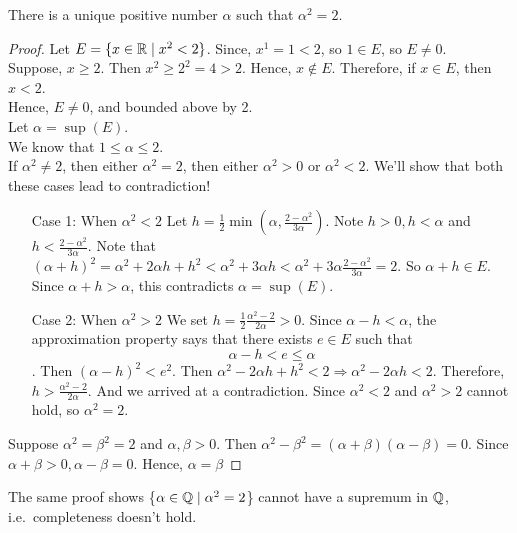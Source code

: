 \documentclass[11pt]{article}
\begin{document}
\begin{theorem}
	There is a unique positive number \(\alpha\) such that \(\alpha^2 = 2\).
\end{theorem}

\begin{proof}
	Let \(E = \{x \in \mathbb R \mid x^2 < 2\}\). Since, \(x^1 = 1 < 2\), so \(1 \in E\), so \(E \neq 0\). \\
	Suppose, \(x \geqslant 2\). Then \(x^2 \geqslant 2^2 = 4 > 2\). Hence, \(x \notin E\).
	Therefore, if \(x \in E\), then \(x < 2\). \\
	Hence, \(E \neq 0\), and bounded above by 2. \\
	Let \(\alpha = \sup(E)\). \\
	We know that \(1 \leqslant \alpha \leqslant 2\). \\
	If \(\alpha^2 \neq 2\), then either \(\alpha^2 = 2\), then either \(\alpha^2 > 0\) or \(\alpha^2 < 2\). We'll show that both these cases lead to contradiction!
	\begin{itemize}
		\item[Case 1:] When \(\alpha^2 < 2\) Let \(h = \frac{1}{2} \min(\alpha, \frac{2 -
			      \alpha^2}{3\alpha})\). Note \(h > 0, h < \alpha\) and \(h < \frac{2
			      -\alpha^2}{3\alpha}\). Note that \((\alpha + h)^2 = \alpha^2 + 2\alpha h + h^2
		      < \alpha^2 + 3\alpha h < \alpha^2 + 3\alpha \frac{2 - \alpha^2}{3\alpha} = 2\).
		      So \(\alpha + h \in E\). Since \(\alpha + h > \alpha\), this contradicts
		      \(\alpha = \sup(E)\).
		\item[Case 2:] When \(\alpha^2 > 2\) We set \(h = \frac{1}{2} \frac{\alpha^2 -
			      2}{2\alpha} > 0\). Since \(\alpha - h < \alpha\), the approximation property
		      says that there exists \(e \in E\) such that \[\alpha - h < e \leqslant \alpha\]. Then \((\alpha - h)^2 < e^2\). Then \(\alpha^2 - 2\alpha h + h^2 < 2 \Rightarrow \alpha^2 - 2\alpha h < 2\). Therefore, \(h > \frac{\alpha^2 - 2}{2\alpha}\). And we arrived at a contradiction. Since \(\alpha^2 < 2\) and \(\alpha^2 > 2\) cannot hold, so \(\alpha^2 = 2\).
	\end{itemize}
	Suppose \(\alpha^2 = \beta^2 = 2\) and \(\alpha, \beta > 0\). Then \(\alpha^2 - \beta^2 = (\alpha + \beta)(\alpha - \beta) = 0\). Since \(\alpha + \beta > 0, \alpha - \beta = 0 \). Hence, \(\alpha = \beta\)
\end{proof}

\begin{remark}
	The same proof shows \{\(\alpha \in \mathbb Q \mid \alpha^2 = 2\)\} cannot have a supremum in \(\mathbb Q\), i.e.\ completeness doesn't hold.
\end{remark}
\end{document}
